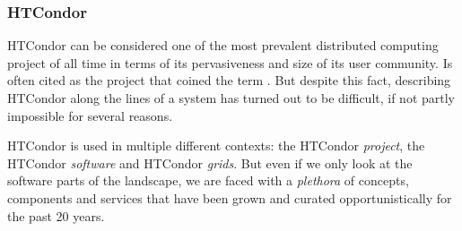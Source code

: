 \documentclass{sig-alternate}
\begin{document}



%
\subsubsection{HTCondor}

HTCondor can be considered one of the most prevalent distributed computing
project of all time in terms of its pervasiveness and size of its  user
community. Is often cited as the project that coined the term \pilotjob. But
despite this fact, describing HTCondor along the lines of a \pilotjob system has
turned out to be difficult, if not partly impossible for several reasons.

HTCondor is used in multiple different contexts: the HTCondor \textit{project},
the HTCondor \textit{software} and HTCondor \textit{grids}. But even if we only
look at the software parts of the landscape, we are faced with a
\textit{plethora} of concepts, components and services that have been grown and
curated opportunistically for the past 20 years.

%
\end{document}

